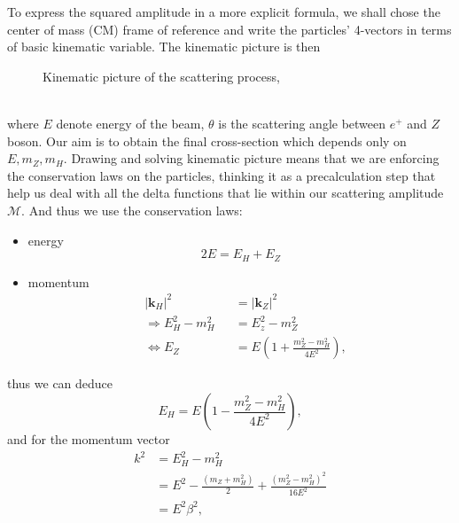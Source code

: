 \documentclass{report}
\numberwithin{equation}{section}
\begin{document}
To express the squared amplitude in a more explicit formula, we shall chose the center of mass (CM) frame of reference and write the particles' 4-vectors in terms of basic kinematic variable. The kinematic picture is then\\
\begin{figure}[h]
\centering
{}
\centering
\caption{Kinematic picture of the scattering process,}
\end{figure}\\
where $E$ denote energy of the beam, $\theta$ is the scattering angle between $e^+$ and $Z$ boson.
Our aim is to obtain the final cross-section which depends only on $E, m_Z,m_H$. Drawing and solving kinematic picture means that we are enforcing the conservation laws on the particles, thinking it as a precalculation step that help us deal with all the delta functions that lie within our scattering amplitude $\mathcal{M}$. And thus we use the conservation laws:
\begin{itemize}
\item energy
\begin{equation}
2E=E_H+E_Z
\end{equation}
\item momentum
\begin{align}
&|\textbf{k}_H|^2&&=|\textbf{k}_Z|^2 \nonumber\\
&\Rightarrow E_H^2- m_H^2&&=E_z^2-m_Z^2\nonumber\\
&\Leftrightarrow E_Z&&=E\left(1+\frac{m_Z^2-m_H^2}{4E^2}\right),\label{15}
\end{align}
\end{itemize}
thus we can deduce
\begin{equation}
E_H=E\left(1-\frac{m_Z^2-m_H^2}{4E^2}\right)\label{16},
\end{equation}
and for the momentum vector 
\begin{equation}
\begin{split}
k^2&=E_H^2-m_H^2\\
&=E^2-\frac{(m_Z+m_H^2)}{2}+\frac{(m_Z^2-m_H^2)^2}{16E^2}\\
&=E^2 \beta^2,
\end{split}
\end{equation}
\end{document}
